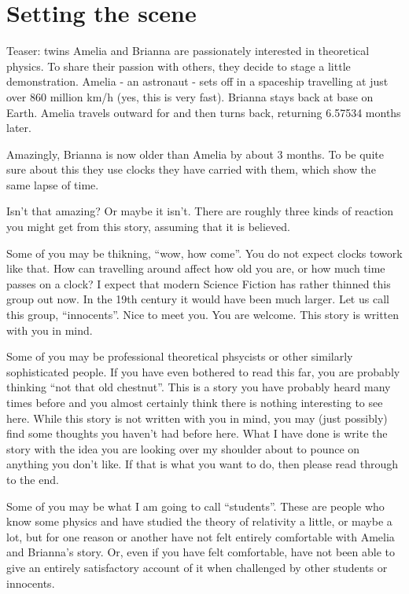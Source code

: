 \documentclass[a4paper]{report}
\begin{document}
\section*{Setting the scene}
Teaser: twins Amelia and Brianna are passionately interested in theoretical physics. To share their passion with others, they decide to stage a little demonstration. Amelia - an astronaut - sets off in a spaceship travelling at just over 860 million km/h (yes, this is very fast). Brianna stays back at base on Earth. Amelia travels outward for and then turns back, returning 6.57534 months later. 

Amazingly, Brianna is now older than Amelia by about 3 months. To be quite sure about this they use clocks they have carried with them, which show the same lapse of time.

Isn't that amazing? Or maybe it isn't. There are roughly three kinds of reaction you might get from this story, assuming that it is believed.

Some of you may be thikning, ``wow, how come''. You do not expect clocks towork like that. How can travelling around affect how old you are, or how much time passes on a clock? I expect that modern Science Fiction has rather thinned this group out now. In the 19th century it would have been much larger. Let us call this group, ``innocents''. Nice to meet you. You are welcome. This story is written with you in mind.

Some of you may be professional theoretical phsycists or other similarly sophisticated people. If you have even bothered to read this far, you are probably thinking ``not that old chestnut''. This is a story you have probably heard many times before and you almost certainly think there is nothing interesting to see here. While this story is not written with you in mind, you may (just possibly) find some thoughts you haven't had before here. What I have done is write the story with the idea you are looking over my shoulder about to pounce on anything you don't like. If that is what you want to do, then please read through to the end.

Some of you may be what I am going to call ``students''. These are people who know some physics and have studied the theory of relativity a little, or maybe a lot, but for one reason or another have not felt entirely comfortable with Amelia and Brianna's story. Or, even if you have felt comfortable, have not been able to give an entirely satisfactory account of it when challenged by other students or innocents.
\end{document}
